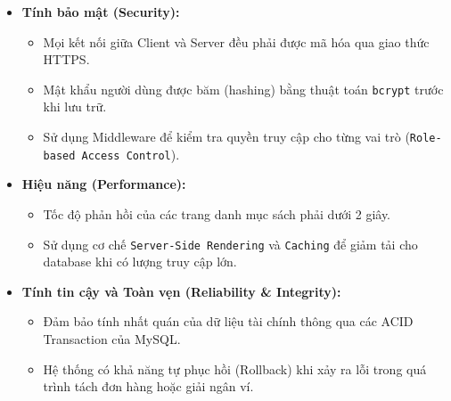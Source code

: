 \documentclass[../main.tex]{subfiles}
\begin{document}
\begin{itemize}
    \item \textbf{Tính bảo mật (Security):}
    \begin{itemize}
        \item Mọi kết nối giữa Client và Server đều phải được mã hóa qua giao thức HTTPS.
        \item Mật khẩu người dùng được băm (hashing) bằng thuật toán \texttt{bcrypt} trước khi lưu trữ.
        \item Sử dụng Middleware để kiểm tra quyền truy cập cho từng vai trò (\texttt{Role-based Access Control}).
    \end{itemize}
    \item \textbf{Hiệu năng (Performance):}
    \begin{itemize}
        \item Tốc độ phản hồi của các trang danh mục sách phải dưới 2 giây.
        \item Sử dụng cơ chế \texttt{Server-Side Rendering} và \texttt{Caching} để giảm tải cho database khi có lượng truy cập lớn.
    \end{itemize}
    \item \textbf{Tính tin cậy và Toàn vẹn (Reliability \& Integrity):}
    \begin{itemize}
        \item Đảm bảo tính nhất quán của dữ liệu tài chính thông qua các ACID Transaction của MySQL.
        \item Hệ thống có khả năng tự phục hồi (Rollback) khi xảy ra lỗi trong quá trình tách đơn hàng hoặc giải ngân ví.
    \end{itemize}
\end{itemize}
\end{document}
